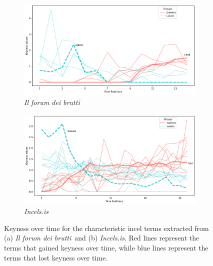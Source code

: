 \documentclass[11pt]{article}
\newcommand{\enforum}{\textit{Incels.is}}
\newcommand{\itforum}{\textit{Il forum dei brutti}}
\begin{document}
\begin{figure}[]
  \centering
  \begin{subfigure}[b]{\textwidth}
    \includegraphics[width=\textwidth]{images-tables/keyness_chart_fdb.pdf}
    \caption{\itforum}
  \end{subfigure}
  \begin{subfigure}[b]{\textwidth}
    \includegraphics[width=\textwidth]{images-tables/keyness_chart_incelsis.pdf}
    \caption{\enforum}
  \end{subfigure}
  \caption[Keyness graph for \itforum\, and \enforum.]{Keyness over time for the characteristic incel terms extracted from (a) \itforum\, and (b) \enforum. Red lines represent the terms that gained keyness over time, while blue lines represent the terms that lost keyness over time.}
  \label{fig:keyness-over-time}
\end{figure}
\end{document}
